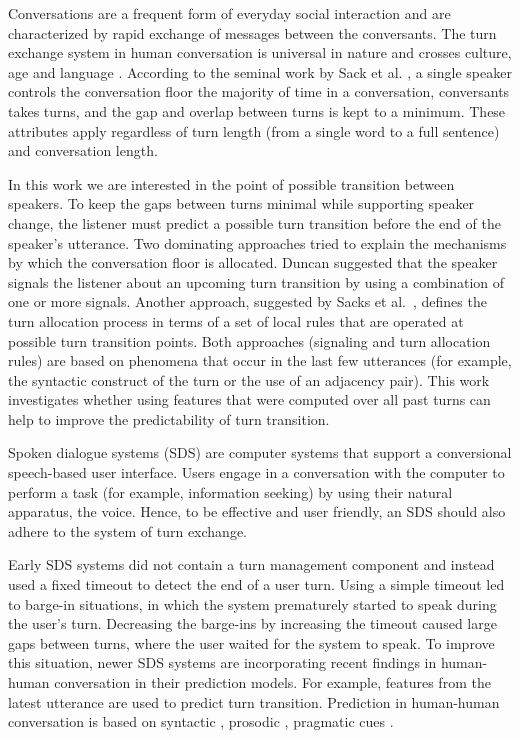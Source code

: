 Conversations are a frequent form of everyday social interaction and are characterized by rapid exchange of messages between the conversants.
The turn exchange system in human conversation is universal in nature and crosses culture, age and language \cite{levinson2016turn}. According to the
seminal work by Sack et al. \cite{sacks1974simplest}, a single speaker controls the conversation floor the majority of time in a conversation, conversants takes turns, and the gap and overlap between turns is kept to a minimum. These attributes apply regardless of turn length (from a single word to a full sentence) and conversation length.

In this work we are interested in the point of possible transition between speakers. To keep the gaps between turns minimal while supporting speaker change, the listener
must predict a possible turn transition before the end of the speaker's utterance. Two dominating approaches tried to explain the mechanisms by which
the conversation floor is allocated. Duncan \cite{duncan1972some} suggested that the speaker signals the listener about an upcoming turn transition by using a combination of one or more signals.
Another approach, suggested by Sacks et al.~\cite{sacks1974simplest}, defines the turn allocation process in terms of a set of local rules that are operated at possible turn transition points.
Both approaches (signaling and turn allocation rules) are based on phenomena that occur in the last few utterances (for example, the syntactic construct of the turn or the use of an adjacency pair). This work investigates whether using features that were computed over all past turns can help to improve the predictability of turn transition.

Spoken dialogue systems (SDS) are computer systems that support a conversional speech-based user interface. Users engage in a conversation with the computer to
perform a task (for example, information seeking) by using their natural apparatus, the voice. Hence, to be effective and user friendly, an SDS should also adhere to the system of turn exchange.

Early SDS systems did not contain a turn management component and instead used a fixed timeout to detect the end of a user turn. Using a simple timeout led to barge-in situations, in which the system prematurely started to speak during the user's turn. Decreasing the barge-ins by increasing the timeout caused large gaps between turns, where the user waited for the system to speak.
To improve this situation, newer SDS systems are incorporating recent findings in human-human conversation in their prediction models. For example, features from the latest utterance are used to predict turn transition. Prediction in human-human conversation is based on syntactic \cite{sacks1974simplest,de2006projecting}, prosodic  \cite{ford1996interactional,stolcke2002speaker,ferrer2003prosody}, pragmatic cues  \cite{ford2001intersection}.

